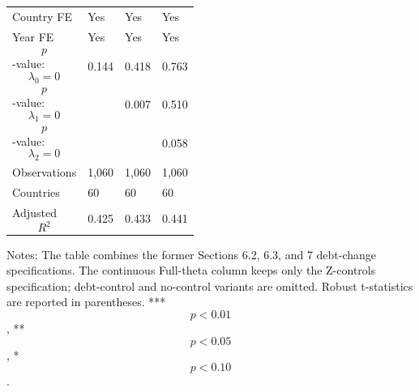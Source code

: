 \begin{table}[H]
\begin{threeparttable}
\begin{tabularx}{\textwidth}{lYYY}
Country FE & Yes & Yes & Yes \\
Year FE & Yes & Yes & Yes \\
$$p$$-value: $$\lambda_0=0$$ & 0.144 & 0.418 & 0.763 \\
$$p$$-value: $$\lambda_1=0$$ &  & 0.007 & 0.510 \\
$$p$$-value: $$\lambda_2=0$$ &  &  & 0.058 \\
Observations & 1,060 & 1,060 & 1,060 \\
Countries & 60 & 60 & 60 \\
Adjusted $$R^2$$ & 0.425 & 0.433 & 0.441 \\
\bottomrule
\end{tabularx}
\begin{tablenotes}[flushleft]\footnotesize
\item Notes: The table combines the former Sections 6.2, 6.3, and 7 debt-change specifications. The continuous Full-theta column keeps only the Z-controls specification; debt-control and no-control variants are omitted. Robust t-statistics are reported in parentheses. *** $$p<0.01$$, ** $$p<0.05$$, * $$p<0.10$$.
\end{tablenotes}
\end{threeparttable}
\end{table}
